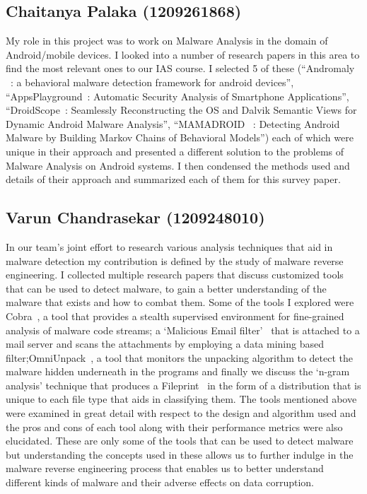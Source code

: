 \documentclass[11pt]{article}
\begin{document}
\subsection{Chaitanya Palaka (1209261868)}
My role in this project was to work on Malware Analysis in the domain of Android/mobile devices. I looked into a number of research papers in this area to find the most relevant ones to our IAS course. I selected 5 of these (“Andromaly ~\cite{shabtai2012andromaly}: a behavioral malware detection framework for android devices”, “AppsPlayground~\cite{rastogi2013appsplayground}: Automatic Security Analysis of Smartphone Applications”, “DroidScope~\cite{yan2012droidscope}: Seamlessly Reconstructing the OS and Dalvik Semantic Views for Dynamic Android Malware Analysis”, “MAMADROID~\cite{mariconti2016mamadroid} : Detecting Android Malware by Building Markov Chains of Behavioral Models”) each of which were unique in their approach and presented a different solution to the problems of Malware Analysis on Android systems. I then condensed the methods used and details of their approach and summarized each of them for this survey paper.


\subsection{Varun Chandrasekar (1209248010)}
In our team's joint effort to research various analysis techniques that aid in malware detection my contribution is defined by the study of malware reverse engineering. I collected multiple research papers that discuss customized tools that can be used to detect malware, to gain a better understanding of the malware that exists and how to combat them. Some of the tools I explored were Cobra~\cite{vasudevan2006cobra}, a tool that provides a stealth supervised environment for fine-grained analysis of malware code streams; a ‘Malicious Email filter’~\cite{schultz2001mef} that is attached to a mail server and scans the attachments by employing a data mining based filter;OmniUnpack~\cite{martignoni2007omniunpack}, a tool that monitors the unpacking algorithm to detect the malware hidden underneath in the programs and finally we discuss the ‘n-gram analysis’ technique that produces a Fileprint~\cite{li2005fileprints} in the form of a distribution that is unique to each file type that aids in classifying them.
The tools mentioned above were examined in great detail with respect to the design and algorithm used and the pros and cons of each tool along with their performance metrics were also elucidated. These are only some of the tools that can be used to detect malware but understanding the concepts used in these allows us to further indulge in the malware reverse engineering process that enables us to better understand different kinds of malware and their adverse effects on data corruption.
 
\end{document}
